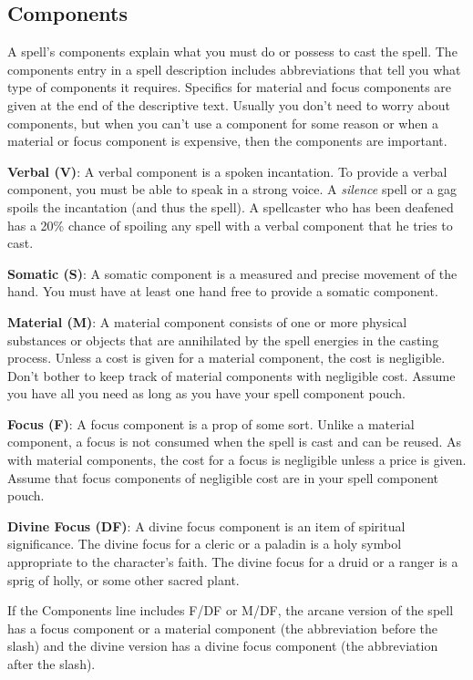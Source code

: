 \subsection{Components}

				
A spell's components explain what you must do or possess to cast the spell. The components entry in a spell description includes abbreviations that tell you what type of components it requires. Specifics for material and focus components are given at the end of the descriptive text. Usually you don't need to worry about components, but when you can't use a component for some reason or when a material or focus component is expensive, then the components are important.
				
\textbf{Verbal (V)}: A verbal component is a spoken incantation. To provide a verbal component, you must be able to speak in a strong voice. A \textit{silence }spell or a gag spoils the incantation (and thus the spell). A spellcaster who has been deafened has a 20\% chance of spoiling any spell with a verbal component that he tries to cast.
				
\textbf{Somatic (S)}: A somatic component is a measured and precise movement of the hand. You must have at least one hand free to provide a somatic component.
				
\textbf{Material (M)}: A material component consists of one or more physical substances or objects that are annihilated by the spell energies in the casting process. Unless a cost is given for a material component, the cost is negligible. Don't bother to keep track of material components with negligible cost. Assume you have all you need as long as you have your spell component pouch.
				
\textbf{Focus (F)}: A focus component is a prop of some sort. Unlike a material component, a focus is not consumed when the spell is cast and can be reused. As with material components, the cost for a focus is negligible unless a price is given. Assume that focus components of negligible cost are in your spell component pouch.
				
\textbf{Divine Focus (DF)}: A divine focus component is an item of spiritual significance. The divine focus for a cleric or a paladin is a holy symbol appropriate to the character's faith. The divine focus for a druid or a ranger is a sprig of holly, or some other sacred plant.
				
If the Components line includes F/DF or M/DF, the arcane version of the spell has a focus component or a material component (the abbreviation before the slash) and the divine version has a divine focus component (the abbreviation after the slash).
				
